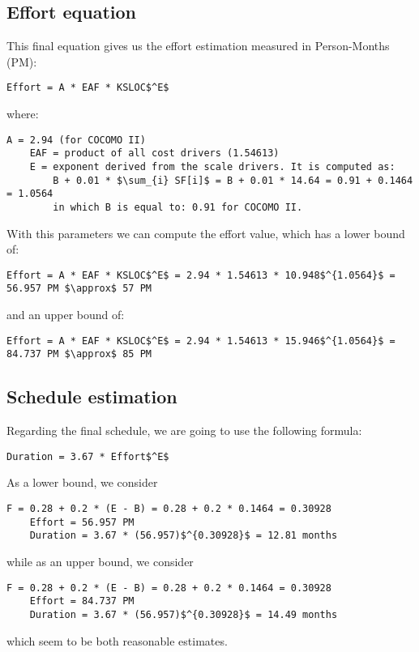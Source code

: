 \subsection{Effort equation}
This final equation gives us the effort estimation measured in Person-Months (PM):
\begin{lstlisting}[mathescape, numbers=none]
	Effort = A * EAF * KSLOC$^E$
\end{lstlisting}
where:
\begin{lstlisting}[mathescape, numbers=none]
	A = 2.94 (for COCOMO II) 
	EAF = product of all cost drivers (1.54613)
	E = exponent derived from the scale drivers. It is computed as:
		B + 0.01 * $\sum_{i} SF[i]$ = B + 0.01 * 14.64 = 0.91 + 0.1464 = 1.0564
		in which B is equal to: 0.91 for COCOMO II.
\end{lstlisting}

With this parameters we can compute the effort value, which has a lower bound of:
\begin{lstlisting}[mathescape, numbers=none]
	Effort = A * EAF * KSLOC$^E$ = 2.94 * 1.54613 * 10.948$^{1.0564}$ = 56.957 PM $\approx$ 57 PM
\end{lstlisting}
and an upper bound of:
\begin{lstlisting}[mathescape, numbers=none]
	Effort = A * EAF * KSLOC$^E$ = 2.94 * 1.54613 * 15.946$^{1.0564}$ = 84.737 PM $\approx$ 85 PM
\end{lstlisting}

\subsection{Schedule estimation}
Regarding the final schedule, we are going to use the following formula:
\begin{lstlisting}[mathescape, numbers=none]
	Duration = 3.67 * Effort$^E$
\end{lstlisting}
As a lower bound, we consider
\begin{lstlisting}[mathescape, numbers=none]
	F = 0.28 + 0.2 * (E - B) = 0.28 + 0.2 * 0.1464 = 0.30928
	Effort = 56.957 PM 
	Duration = 3.67 * (56.957)$^{0.30928}$ = 12.81 months
\end{lstlisting}
while as an upper bound, we consider
\begin{lstlisting}[mathescape, numbers=none]
	F = 0.28 + 0.2 * (E - B) = 0.28 + 0.2 * 0.1464 = 0.30928
	Effort = 84.737 PM 
	Duration = 3.67 * (56.957)$^{0.30928}$ = 14.49 months
\end{lstlisting}
which seem to be both reasonable estimates. 